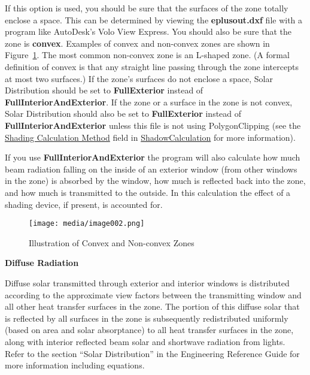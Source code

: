 If this option is used, you should be sure that the surfaces of the zone totally enclose a space. This can be determined by viewing the \textbf{eplusout.dxf} file with a program like AutoDesk's Volo View Express. You should also be sure that the zone is \textbf{convex}. Examples of convex and non-convex zones are shown in Figure~\ref{fig:illustration-of-convex-and-non-convex-zones}. The most common non-convex zone is an L-shaped zone. (A formal definition of convex is that any straight line passing through the zone intercepts at most two surfaces.) If the zone's surfaces do not enclose a space, Solar Distribution should be set to \textbf{FullExterior} instead of \textbf{FullInteriorAndExterior}.  If the zone or a surface in the zone is not convex, Solar Distribution should also be set to \textbf{FullExterior} instead of \textbf{FullInteriorAndExterior} unless this file is not using PolygonClipping (see the \hyperref [field-shading-calculation-method]{Shading Calculation Method} field in \hyperref[shadowcalculation]{ShadowCalculation} for more information).

If you use \textbf{FullInteriorAndExterior} the program will also calculate how much beam radiation falling on the inside of an exterior window (from other windows in the zone) is absorbed by the window, how much is reflected back into the zone, and how much is transmitted to the outside. In this calculation the effect of a shading device, if present, is accounted for.

\begin{figure}[hbtp] %
    \centering
    \texttt{[image: media/image002.png]}
    \caption{Illustration of Convex and Non-convex Zones \protect \label{fig:illustration-of-convex-and-non-convex-zones}}
\end{figure}

\textbf{Diffuse Radiation}

Diffuse solar transmitted through exterior and interior windows is distributed according to the approximate view factors between the transmitting window and all other heat transfer surfaces in the zone.
The portion of this diffuse solar that is reflected by all surfaces in the zone is subsequently redistributed uniformly (based on area and solar absorptance) to all heat transfer surfaces in the zone, along with interior reflected beam solar and shortwave radiation from lights. Refer to the section ``Solar Distribution'' in the Engineering Reference Guide for more information including equations.

